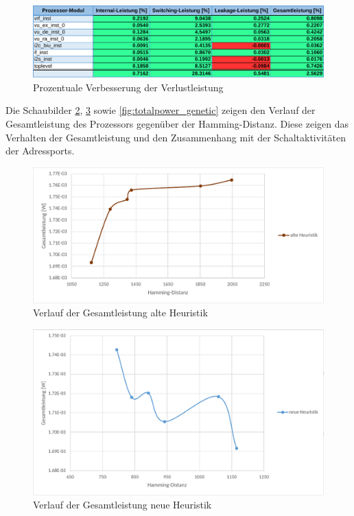 \begin{figure}[H]
	\centering
	\includegraphics[width=\textwidth]{fig/power_percent_genetic.pdf}
	\caption{Prozentuale Verbesserung der Verlustleistung}
	\label{fig:power_percent_genetic}
\end{figure}

Die Schaubilder \ref{fig:totalpower_old}, \ref{fig:totalpower_new} sowie \ref{fig:totalpower_genetic} zeigen den Verlauf der Gesamtleistung des Prozessors gegenüber der Hamming-Distanz. Diese zeigen das Verhalten der Gesamtleistung und den Zusammenhang mit der Schaltaktivitäten der Adressports.

\begin{figure}[H]
	\centering
	\includegraphics[width=\textwidth]{fig/totalpower_old.pdf}
	\caption{Verlauf der Gesamtleistung alte Heuristik }
	\label{fig:totalpower_old}
\end{figure}

\begin{figure}[H]
	\centering
	\includegraphics[width=\textwidth]{fig/totalpower_new.pdf}
	\caption{Verlauf der Gesamtleistung neue Heuristik}
	\label{fig:totalpower_new}
\end{figure}


